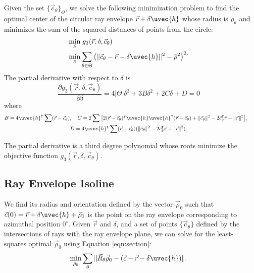 Given the set $\{\vec{c}_\theta\}_\Theta$, we solve the following minimization problem to find the optimal center of the circular ray envelope $\vec{r} + \delta \uvec{h}$ whose radius is $\overline{\rho}_\theta$ and minimizes the sum of the squared distances of points from the circle:
\begin{equation}
    \begin{split}
        \min_\delta & \; g_3(\vec{r}, \delta, \vec{c}_\theta) \\
        \min_\delta & \sum_{\theta \in \Theta} \big( \| \vec{c}_\theta - \vec{r} - \delta \uvec{h} \|^2 - \overline{\rho}^2 \big)^2
    \end{split}.
\end{equation}
%
The partial derivative with respect to $\delta$ is
\begin{equation}
    \frac{\partial g_3(\vec{r}, \delta, \vec{c}_\theta)}{\partial \delta} = 4 |\Theta| \delta^3 + 3 B \delta^2 + 2 C \delta + D = 0
\end{equation}
where
\begin{gather}
    B = 4\uvec{h}^\intercal \sum (\vec{r} - \vec{c}_\theta), \quad C = 2\sum \big[2(\vec{r} - \vec{c}_\theta)^\intercal \uvec{h}\uvec{h}^\intercal(\vec{r} - \vec{c}_\theta) + \|\vec{c}_\theta\|^2 - 2\vec{c}^\intercal_\theta \vec{r} + \|\vec{r}\|^2 \big], \quad \\ D = 4\uvec{h}^\intercal \sum (\vec{r} - \vec{c}_\theta)(\|\vec{c}_\theta\|^2 - 2\vec{c}^\intercal_\theta \vec{r} + \|\vec{r}\|^2).
\end{gather}

The partial derivative is a third degree polynomial whose roots minimize the objective function $g_3(\vec{r}, \delta, \vec{c}_\theta)$.

\subsection{Ray Envelope Isoline}
We find its radius and orientation defined by the vector $\vec{\rho}_0$ such that $\vec{c}(0) = \vec{r} + \delta \uvec{h} + \vec{\rho}_0$ is the point on the ray envelope corresponding to azimuthal position $0^\circ$. Given $\vec{r}$ and $\delta$, and a set of points $\{\vec{c}_\theta\}$ defined by the intersections of rays with the ray envelope plane, we can solve for the least-squares optimal $\vec{\rho}_0$ using Equation \ref{eqn:section}:
%
\begin{equation}
    \min_{\vec{\rho}_0} \sum_{\theta} \| \vec{R}_\theta \vec{\rho}_0 - (\vec{c} - \vec{r} - \delta \uvec{h}) \|.
\end{equation}


